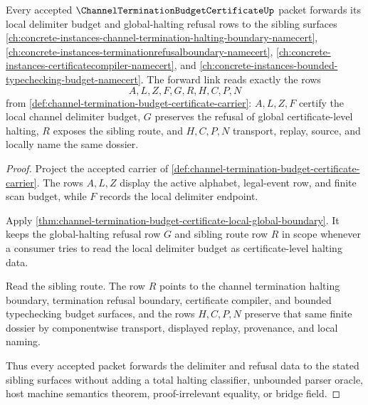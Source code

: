 \begin{theorem}
\label{thm:channel-termination-budget-certificate-dossier-forward-link}
Every accepted $\ChannelTerminationBudgetCertificateUp$ packet forwards its local delimiter budget and global-halting refusal rows to the sibling surfaces \autoref{ch:concrete-instances-channel-termination-halting-boundary-namecert}, \autoref{ch:concrete-instances-terminationrefusalboundary-namecert}, \autoref{ch:concrete-instances-certificatecompiler-namecert}, and \autoref{ch:concrete-instances-bounded-typechecking-budget-namecert}. The forward link reads exactly the rows
$$
A,L,Z,F,G,R,H,C,P,N
$$
from \autoref{def:channel-termination-budget-certificate-carrier}: $A,L,Z,F$ certify the local channel delimiter budget, $G$ preserves the refusal of global certificate-level halting, $R$ exposes the sibling route, and $H,C,P,N$ transport, replay, source, and locally name the same dossier.
\end{theorem}
\begin{proof}
Project the accepted carrier of \autoref{def:channel-termination-budget-certificate-carrier}. The rows $A,L,Z$ display the active alphabet, legal-event row, and finite scan budget, while $F$ records the local delimiter endpoint.

Apply \autoref{thm:channel-termination-budget-certificate-local-global-boundary}. It keeps the global-halting refusal row $G$ and sibling route row $R$ in scope whenever a consumer tries to read the local delimiter budget as certificate-level halting data.

Read the sibling route. The row $R$ points to the channel termination halting boundary, termination refusal boundary, certificate compiler, and bounded typechecking budget surfaces, and the rows $H,C,P,N$ preserve that same finite dossier by componentwise transport, displayed replay, provenance, and local naming.

Thus every accepted packet forwards the delimiter and refusal data to the stated sibling surfaces without adding a total halting classifier, unbounded parser oracle, host machine semantics theorem, proof-irrelevant equality, or bridge field.
\end{proof}
